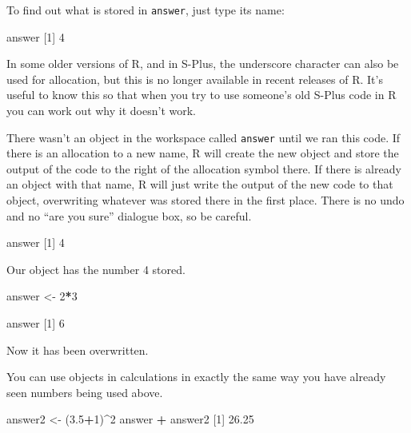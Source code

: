 \documentclass[
]{book}
\newenvironment{Shaded}{\begin{snugshade}}{\end{snugshade}}
\newcommand{\DecValTok}[1]{\textcolor[rgb]{0.00,0.00,0.81}{#1}}
\newcommand{\FloatTok}[1]{\textcolor[rgb]{0.00,0.00,0.81}{#1}}
\newcommand{\NormalTok}[1]{#1}
\newcommand{\OperatorTok}[1]{\textcolor[rgb]{0.81,0.36,0.00}{\textbf{#1}}}
\newcommand{\StringTok}[1]{\textcolor[rgb]{0.31,0.60,0.02}{#1}}
\begin{document}
To find out what is stored in \texttt{answer}, just type its name:

\begin{Shaded}
\begin{Highlighting}[]
\NormalTok{answer}
\NormalTok{[}\DecValTok{1}\NormalTok{] }\DecValTok{4}
\end{Highlighting}
\end{Shaded}

In some older versions of R, and in S-Plus, the underscore character can also be used for allocation, but this is no longer available in recent releases of R. It's useful to know this so that when you try to use someone's old S-Plus code in R you can work out why it doesn't work.

There wasn't an object in the workspace called \texttt{answer} until we ran this code. If there is an allocation to a new name, R will create the new object and store the output of the code to the right of the allocation symbol there. If there is already an object with that name, R will just write the output of the new code to that object, overwriting whatever was stored there in the first place. There is no undo and no ``are you sure'' dialogue box, so be careful.

\begin{Shaded}
\begin{Highlighting}[]
\NormalTok{answer}
\NormalTok{[}\DecValTok{1}\NormalTok{] }\DecValTok{4}
\end{Highlighting}
\end{Shaded}

Our object has the number 4 stored.

\begin{Shaded}
\begin{Highlighting}[]
\NormalTok{answer <-}\StringTok{ }\DecValTok{2}\OperatorTok{*}\DecValTok{3}

\NormalTok{answer}
\NormalTok{[}\DecValTok{1}\NormalTok{] }\DecValTok{6}
\end{Highlighting}
\end{Shaded}

Now it has been overwritten.

You can use objects in calculations in exactly the same way you have already seen numbers being used above.

\begin{Shaded}
\begin{Highlighting}[]
\NormalTok{answer2 <-}\StringTok{ }\NormalTok{(}\FloatTok{3.5}\OperatorTok{+}\DecValTok{1}\NormalTok{)}\OperatorTok{^}\DecValTok{2}
\NormalTok{answer }\OperatorTok{+}\StringTok{ }\NormalTok{answer2}
\NormalTok{[}\DecValTok{1}\NormalTok{] }\FloatTok{26.25}
\end{Highlighting}
\end{Shaded}
\end{document}
